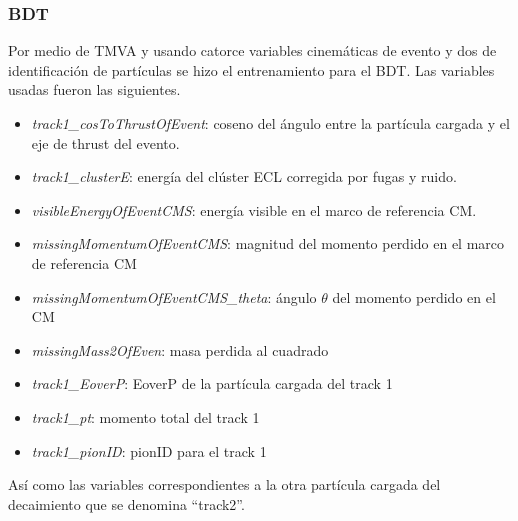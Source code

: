 \subsubsection{BDT}

Por medio de TMVA y usando catorce variables cinemáticas de evento y dos de identificación de partículas se hizo el entrenamiento para el BDT. Las variables usadas fueron las siguientes.


\begin{itemize}
    \item \textit{track1\_cosToThrustOfEvent}:  coseno del ángulo entre la partícula cargada y el eje de thrust del evento.
    \item 
    \textit{track1\_clusterE}: energía del clúster ECL corregida por fugas y ruido.
    \item 
    \textit{visibleEnergyOfEventCMS}: energía visible en el marco de referencia CM.
    \item
    \textit{missingMomentumOfEventCMS}: magnitud del momento perdido en el marco de referencia CM
    \item
    \textit{missingMomentumOfEventCMS\_theta}: ángulo \(\theta\) del momento perdido en el CM
    \item
    \textit{missingMass2OfEven}: masa perdida al cuadrado
    \item
    \textit{track1\_EoverP}: EoverP de la partícula cargada del track 1
    \item
    \textit{track1\_pt}: momento total del track 1
    \item
    \textit{track1\_pionID}: pionID para el track 1
\end{itemize}

Así como las variables correspondientes a la otra partícula cargada del decaimiento que se denomina ``track2''.

